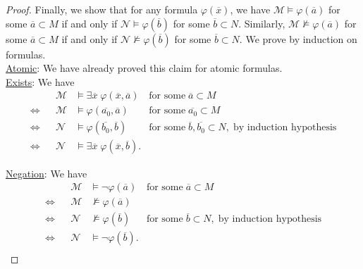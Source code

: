 \documentclass{article}
\begin{document}
\begin{enumerate}[label={\bf Q\arabic*:}]
\begin{proof}
      Finally, we show that for any formula $\varphi(\overline{x})$, we
      have $\mathcal{M}\models\varphi(\overline{a})$ for some
      $\overline{a}\subset M$ if and only if
      $\mathcal{N}\models\varphi(\overline{b})$ for some
      $\overline{b}\subset N$. Similarly,
      $\mathcal{M}\not\models\varphi(\overline{a})$ for some
      $\overline{a}\subset M$ if and only if
      $\mathcal{N}\not\models\varphi(\overline{b})$ for some
      $\overline{b}\subset N$. We prove by induction on formulas. \\

      \underline{Atomic}: We have already proved this claim for atomic
      formulas. \\

      \underline{Exists}: We have
      \begin{align*}
                    && \mathcal{M}
                    & \models\exists\overline{x}\;
                      \varphi(\overline{x},\overline{a})
                    & \text{for some}\; \overline{a}\subset M \\
        \Leftrightarrow && \mathcal{M}
                    & \models\varphi(\overline{a_0},\overline{a})
                    & \text{for some}\; \overline{a_0}\subset M \\
        \Leftrightarrow && \mathcal{N}
                    & \models\varphi(\overline{b_0},\overline{b})
                    & \text{for some}\; \overline{b},\overline{b_0}\subset
                      N,\; \text{by induction hypothesis} \\
        \Leftrightarrow && \mathcal{N}
                    & \models\exists\overline{x}\;
                      \varphi(\overline{x},\overline{b}).
      \end{align*}

      \underline{Negation}: We have
      \begin{align*}
                    && \mathcal{M}
                    & \models\neg\varphi(\overline{a})
                    & \text{for some}\; \overline{a}\subset M \\
        \Leftrightarrow && \mathcal{M}
                    & \not\models\varphi(\overline{a}) & \\
        \Leftrightarrow && \mathcal{N}
                    & \not\models\varphi(\overline{b})
                    & \text{for some}\; \overline{b}\subset N,\; \text{by
                      induction hypothesis} \\
        \Leftrightarrow && \mathcal{N}
                    & \models\neg\varphi(\overline{b}). & \\
      \end{align*}


\end{proof}
\end{enumerate}
\end{document}
